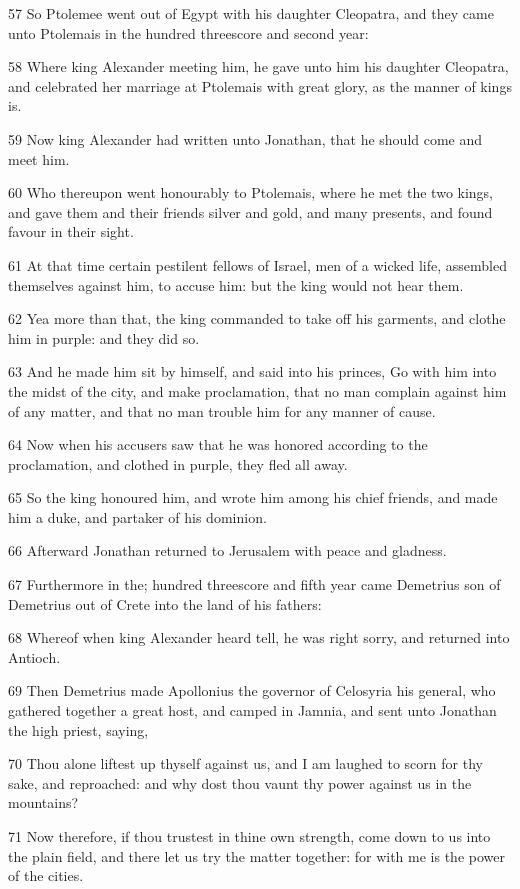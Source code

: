 \par 57 So Ptolemee went out of Egypt with his daughter Cleopatra, and they came unto Ptolemais in the hundred threescore and second year:
\par 58 Where king Alexander meeting him, he gave unto him his daughter Cleopatra, and celebrated her marriage at Ptolemais with great glory, as the manner of kings is.
\par 59 Now king Alexander had written unto Jonathan, that he should come and meet him.
\par 60 Who thereupon went honourably to Ptolemais, where he met the two kings, and gave them and their friends silver and gold, and many presents, and found favour in their sight.
\par 61 At that time certain pestilent fellows of Israel, men of a wicked life, assembled themselves against him, to accuse him: but the king would not hear them.
\par 62 Yea more than that, the king commanded to take off his garments, and clothe him in purple: and they did so.
\par 63 And he made him sit by himself, and said into his princes, Go with him into the midst of the city, and make proclamation, that no man complain against him of any matter, and that no man trouble him for any manner of cause.
\par 64 Now when his accusers saw that he was honored according to the proclamation, and clothed in purple, they fled all away.
\par 65 So the king honoured him, and wrote him among his chief friends, and made him a duke, and partaker of his dominion.
\par 66 Afterward Jonathan returned to Jerusalem with peace and gladness.
\par 67 Furthermore in the; hundred threescore and fifth year came Demetrius son of Demetrius out of Crete into the land of his fathers:
\par 68 Whereof when king Alexander heard tell, he was right sorry, and returned into Antioch.
\par 69 Then Demetrius made Apollonius the governor of Celosyria his general, who gathered together a great host, and camped in Jamnia, and sent unto Jonathan the high priest, saying,
\par 70 Thou alone liftest up thyself against us, and I am laughed to scorn for thy sake, and reproached: and why dost thou vaunt thy power against us in the mountains?
\par 71 Now therefore, if thou trustest in thine own strength, come down to us into the plain field, and there let us try the matter together: for with me is the power of the cities.
